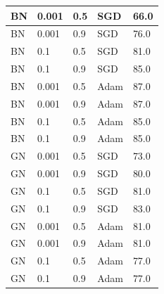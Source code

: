 \documentclass[conference]{IEEEtran}
\begin{document}
\begin{table}[htb]
\begin{tabular}{|p{}|p{}|p{}|p{}|p{}|}
\rule[-4mm]{0mm}{1cm} {BN} & \centerline{0.001} & \centerline{0.5} & \centerline{SGD} & \centerline{66.0}\\\hline
\rule[-4mm]{0mm}{1cm} {BN} & \centerline{0.001} & \centerline{0.9} & \centerline{SGD} & \centerline{76.0}\\\hline
\rule[-4mm]{0mm}{1cm} {BN} & \centerline{0.1} & \centerline{0.5} & \centerline{SGD} & \centerline{81.0}\\\hline
\rule[-4mm]{0mm}{1cm} {BN} & \centerline{0.1} & \centerline{0.9} & \centerline{SGD} & \centerline{85.0}\\\hline
\rule[-4mm]{0mm}{1cm} {BN} & \centerline{0.001} & \centerline{0.5} & \centerline{Adam} & \centerline{87.0}\\\hline
\rule[-4mm]{0mm}{1cm} {BN} & \centerline{0.001} & \centerline{0.9} & \centerline{Adam} & \centerline{87.0}\\\hline
\rule[-4mm]{0mm}{1cm} {BN} & \centerline{0.1} & \centerline{0.5} & \centerline{Adam} & \centerline{85.0}\\\hline
\rule[-4mm]{0mm}{1cm} {BN} & \centerline{0.1} & \centerline{0.9} & \centerline{Adam} & \centerline{85.0}\\\hline
\rule[-4mm]{0mm}{1cm} {GN} & \centerline{0.001} & \centerline{0.5} & \centerline{SGD} & \centerline{73.0}\\\hline
\rule[-4mm]{0mm}{1cm} {GN} & \centerline{0.001} & \centerline{0.9} & \centerline{SGD} & \centerline{80.0}\\\hline
\rule[-4mm]{0mm}{1cm} {GN} & \centerline{0.1} & \centerline{0.5} & \centerline{SGD} & \centerline{81.0}\\\hline
\rule[-4mm]{0mm}{1cm} {GN} & \centerline{0.1} & \centerline{0.9} & \centerline{SGD} & \centerline{83.0}\\\hline
\rule[-4mm]{0mm}{1cm} {GN} & \centerline{0.001} & \centerline{0.5} & \centerline{Adam} & \centerline{81.0}\\\hline
\rule[-4mm]{0mm}{1cm} {GN} & \centerline{0.001} & \centerline{0.9} & \centerline{Adam} & \centerline{81.0}\\\hline
\rule[-4mm]{0mm}{1cm} {GN} & \centerline{0.1} & \centerline{0.5} & \centerline{Adam} & \centerline{77.0}\\\hline
\rule[-4mm]{0mm}{1cm} {GN} & \centerline{0.1} & \centerline{0.9} & \centerline{Adam} & \centerline{77.0}\\\hline
\end{tabular}
\label{tab:1}
\end{table}




\vspace{12pt}
\end{document}
